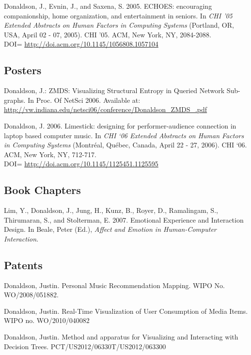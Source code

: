 \documentclass[overlapped,line,letterpaper]{res}
\begin{document}
\begin{resume}
Donaldson, J., Evnin, J., and Saxena, S. 2005. ECHOES: encouraging companionship, home organization, and entertainment in seniors. In \emph{CHI '05 Extended Abstracts on Human Factors in Computing Systems} (Portland, OR, USA, April 02 - 07, 2005). CHI '05. ACM, New York, NY, 2084-2088. \\DOI= \url{http://doi.acm.org/10.1145/1056808.1057104}



\subsection{\bf Posters}
Donaldson, J.: ZMDS: Visualizing Structural Entropy in Queried Network Sub-graphs.   In Proc. Of NetSci 2006. Available at: \url{http://vw.indiana.edu/netsci06/conference/Donaldson_ZMDS_.pdf}

Donaldson, J. 2006. Limestick: designing for performer-audience connection in laptop based computer music. In \emph{CHI `06 Extended Abstracts on Human Factors in Computing Systems} (Montr\'eal, Qu\'ebec, Canada, April 22 - 27, 2006). CHI `06. ACM, New York, NY, 712-717. \\ DOI= \url{http://doi.acm.org/10.1145/1125451.1125595}



\subsection{\bf Book Chapters}
Lim, Y., Donaldson, J., Jung, H., Kunz, B., Royer, D., Ramalingam, S., Thirumaran, S., and Stolterman, E. 2007. Emotional Experience and Interaction Design. In Beale, Peter (Ed.), \emph{Affect and Emotion in Human-Computer Interaction}.

\subsection{\bf Patents}
Donaldson, Justin. Personal Music Recommendation Mapping. WIPO No. WO/2008/051882.

Donaldson, Justin. Real-Time Visualization of User Consumption of Media Items. WIPO no. WO/2010/040082

Donaldson, Justin. Method and apparatus for Visualizing and Interacting with Decision Trees. PCT/US2012/06330T/US2012/063300


\end{resume}
\end{document}
